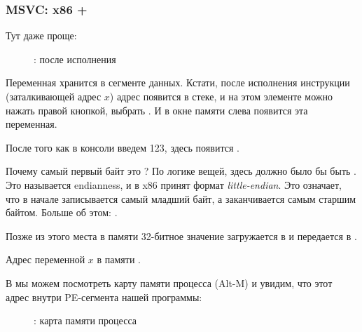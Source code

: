 \clearpage
\subsubsection{MSVC: x86 + \olly}
\myindex{\olly}

Тут даже проще:

\begin{figure}[H]
\centering
{}
\caption{\olly: после исполнения \scanf}
\label{fig:scanf_ex2_olly_1}
\end{figure}

Переменная хранится в сегменте данных.
Кстати, после исполнения инструкции \PUSH (заталкивающей адрес $x$) адрес появится в стеке, 
и на этом элементе можно нажать правой кнопкой, выбрать .
И в окне памяти слева появится эта переменная.

После того как в консоли введем 123, здесь появится .

Почему самый первый байт это ?
По логике вещей, здесь должно было бы быть .
Это называется \gls{endianness}, и в x86 принят формат \emph{little-endian}.
Это означает, что в начале записывается самый младший байт, а заканчивается самым старшим байтом.
Больше об этом: .

Позже из этого места в памяти 32-битное значение загружается в \EAX и передается в \printf.

Адрес переменной $x$ в памяти .

\clearpage
\label{olly_memory_map_example}

В \olly{} мы можем посмотреть карту памяти процесса (Alt-M) и увидим, что этот адрес
внутри PE-сегмента  нашей программы:

\begin{figure}[H]
\centering
{}
\caption{\olly: карта памяти процесса}
\label{fig:scanf_ex2_olly_2}
\end{figure}
